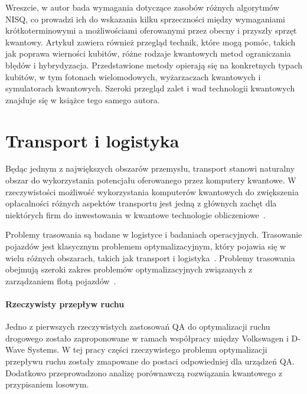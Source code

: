 \documentclass[a4paper,11pt]{article}
\begin{document}
Wreszcie, w \cite{ezratty2023where} autor bada wymagania dotyczące zasobów różnych algorytmów NISQ, co prowadzi ich do wskazania kilku sprzeczności między wymaganiami krótkoterminowymi a możliwościami oferowanymi przez obecny i przyszły sprzęt kwantowy. Artykuł zawiera również przegląd technik, które mogą pomóc, takich jak poprawa wierności kubitów, różne rodzaje kwantowych metod ograniczania błędów i hybrydyzacja. Przedstawione metody opierają się na konkretnych typach kubitów, w tym fotonach wielomodowych, wyżarzaczach kwantowych i symulatorach kwantowych. Szeroki przegląd zalet i wad technologii kwantowych znajduje się w książce \cite{ezratty2021understanding} tego samego autora.



\section{Transport i logistyka}

Będąc jednym z największych obszarów przemysłu, transport stanowi naturalny obszar do wykorzystania potencjału oferowanego przez komputery kwantowe. W rzeczywistości możliwość wykorzystania komputerów kwantowych do zwiększenia opłacalności różnych aspektów transportu jest jedną z głównych zachęt dla niektórych firm do inwestowania w kwantowe technologie obliczeniowe~\cite{bentley2022quantum, cooper2022exploring}.


Problemy trasowania są badane w logistyce i badaniach operacyjnych. 
Trasowanie pojazdów jest klasycznym problemem optymalizacyjnym, który pojawia się w wielu różnych obszarach, takich jak transport i logistyka~\cite{dantzig1959truck,toth2002vehicle}. Problemy trasowania obejmują szeroki zakres problemów optymalizacyjnych związanych z zarządzaniem flotą pojazdów~\cite{harwood2021formulating}. 

\paragraph{Rzeczywisty przepływ ruchu} Jedno z pierwszych rzeczywistych zastosowań QA do optymalizacji ruchu drogowego zostało zaproponowane w ramach współpracy między Volkswagen i D-Wave Systems. W tej pracy części rzeczywistego problemu optymalizacji przepływu ruchu zostały zmapowane do postaci odpowiedniej dla urządzeń QA. Dodatkowo przeprowadzono analizę porównawczą rozwiązania kwantowego z przypisaniem losowym.
\end{document}
